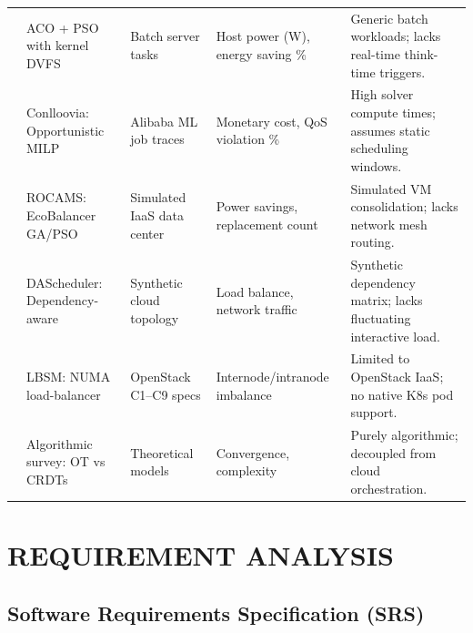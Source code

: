 \documentclass[12pt,a4paper]{report}
\begin{document}
\begin{table}[htbp]
\begin{tabularx}{\linewidth}{@{}p{0.8cm}p{2.8cm}p{2.3cm}p{3.2cm}X@{}}
\cite{dvfs} & ACO + PSO with kernel DVFS & Batch server tasks & Host power (W), energy saving \% & Generic batch workloads; lacks real-time think-time triggers. \\
\cite{conlloovia} & Conlloovia: Opportunistic MILP & Alibaba ML job traces & Monetary cost, QoS violation \% & High solver compute times; assumes static scheduling windows. \\
\cite{rocams} & ROCAMS: EcoBalancer GA/PSO & Simulated IaaS data center & Power savings, replacement count & Simulated VM consolidation; lacks network mesh routing. \\
\cite{dascheduler} & DAScheduler: Dependency-aware & Synthetic cloud topology & Load balance, network traffic & Synthetic dependency matrix; lacks fluctuating interactive load. \\
\cite{lbsm} & LBSM: NUMA load-balancer & OpenStack C1--C9 specs & Internode/intranode imbalance & Limited to OpenStack IaaS; no native K8s pod support. \\
\cite{crdtsurvey} & Algorithmic survey: OT vs CRDTs & Theoretical models & Convergence, complexity & Purely algorithmic; decoupled from cloud orchestration. \\ \bottomrule
\end{tabularx}
\end{table}

\chapter{REQUIREMENT ANALYSIS}

\section{Software Requirements Specification (SRS)}
\end{document}
